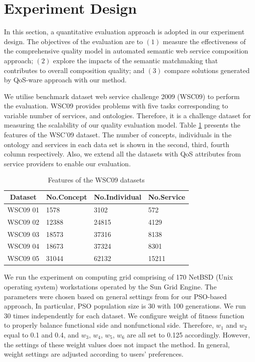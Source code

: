 \documentclass{llncs}
\begin{document}
\section{Experiment Design}\label{experiment_design}
In this section, a quantitative evaluation approach is adopted in our experiment design. The objectives of the evaluation are to $(1)$ measure the effectiveness of the comprehensive quality model in automated semantic web service composition approach; $(2)$ explore the impacts of the semantic matchmaking that contributes to overall composition quality; and $(3)$ compare solutions generated by QoS-ware approach with our method.

We utilise benchmark dataset web service challenge 2009 (WSC09) \cite{kona2009wsc} to perform the evaluation. WSC09 provides problems with five tasks corresponding to variable number of services, and ontologies. Therefore, it is a challenge dataset for measuring the scalability of our quality evaluation model. Table \ref{wsc09datasetTable} presents the features of the WSC’09 dataset. The number of concepts, individuals in the ontology and services in each data set is shown in the second, third, fourth column respectively. Also, we extend all the datasets with QoS attributes from service providers to enable our evaluation. 
\vspace{-0.5cm}
\begin{table}[]
\centering
\caption{Features of the WSC09 datasets}
\label{wsc09datasetTable}
\begin{tabular}{l|l|l|l}
\hline
\multicolumn{1}{c|}{Dataset} & No.Concept & No.Individual & No.Service \\ \hline
WSC09 01                     & 1578       &3102           &572      \\ \hline
WSC09 02                     & 12388      &24815          &4129      \\ \hline
WSC09 03                     & 18573      &37316          &8138      \\ \hline
WSC09 04                     & 18673      &37324          &8301      \\ \hline
WSC09 05                     & 31044      &62132          &15211    \\ \hline
\end{tabular}
\end{table}

\vspace{-0.5cm}
We run the experiment on computing grid comprising of 170 NetBSD (Unix operating system) workstations operated by the Sun Grid Engine. The parameters were chosen based on general settings from \cite{shi2001particle} for our PSO-based approach, In particular, PSO population size is 30 with 100 generations. We run 30 times independently for each dataset. We configure weight of fitness function to properly balance functional side and nonfunctional side. Therefore, $w_{1}$ and $w_{2}$ equal to 0.1 and 0.4,  and $w_{3}$, $w_{4}$, $w_{5}$, $w_{6}$ are all set to 0.125 accordingly. However, the settings of these weight values does not impact the method. In general, weight settings are adjusted according to users' preferences.
\end{document}
